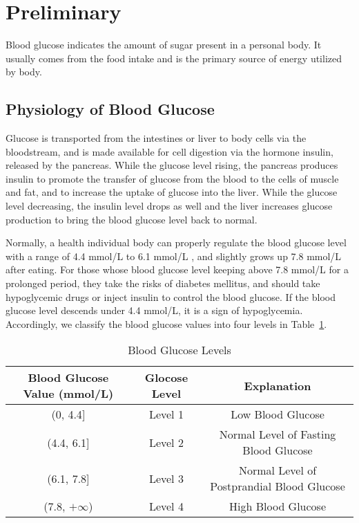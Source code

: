 
\section{Preliminary}
\label{sec:preliminary}
 Blood glucose indicates the amount of sugar present in a personal body. It usually comes from the food intake and is the primary source of energy utilized by body.
 \subsection{Physiology of Blood Glucose }
 Glucose is transported from the intestines or liver to body cells via the bloodstream, and is made available for cell digestion via the hormone insulin, released by the pancreas. While the glucose level rising, the pancreas produces insulin to promote the transfer of glucose from the blood to the cells of muscle and fat, and to increase the uptake of glucose into the liver. While the glucose level decreasing, the insulin level drops as well and the liver increases glucose production  to bring the blood glucose level back to normal.

 Normally, a health individual body can properly regulate the blood glucose level with a range of 4.4 mmol/L to 6.1 mmol/L \cite{bib:blood_sugar}, and slightly grows up 7.8 mmol/L after eating. For those whose blood glucose level keeping above 7.8 mmol/L for a prolonged period, they take the risks of diabetes mellitus, and should take hypoglycemic drugs or inject insulin to control the blood glucose. If the blood glucose level descends under 4.4 mmol/L, it is a sign of hypoglycemia. Accordingly, we classify the blood glucose values into four levels in Table~\ref{blood_glucose_levels}.

\begin{table}[]
\centering
\caption{Blood Glucose Levels}
\label{blood_glucose_levels}
\begin{tabular}{|c|c|c|}
\hline
\textbf{Blood Glucose Value (mmol/L)} & \textbf{Glocose Level} & \textbf{Explanation}                      \\ \hline
(0, 4.4{]}                            & Level 1                & Low Blood Glucose                          \\ \hline
(4.4, 6.1{]}                          & Level 2                & Normal Level of Fasting Blood Glucose      \\ \hline
(6.1, 7.8{]}                          & Level 3                & Normal Level of Postprandial Blood Glucose \\ \hline
(7.8, $+\infty$)                               & Level 4                & High Blood Glucose                         \\ \hline
\end{tabular}
\end{table}

